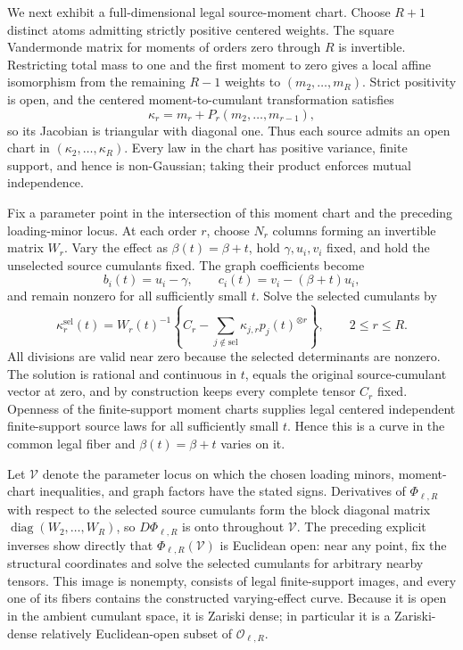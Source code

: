 We next exhibit a full-dimensional legal source-moment chart.  Choose \(R+1\) distinct atoms admitting strictly positive centered weights.  The square Vandermonde matrix for moments of orders zero through \(R\) is invertible.  Restricting total mass to one and the first moment to zero gives a local affine isomorphism from the remaining \(R-1\) weights to \((m_2,\ldots,m_R)\).  Strict positivity is open, and the centered moment-to-cumulant transformation satisfies
\[
 \kappa_r=m_r+P_r(m_2,\ldots,m_{r-1}),
\]
so its Jacobian is triangular with diagonal one.  Thus each source admits an open chart in \((\kappa_2,\ldots,\kappa_R)\).  Every law in the chart has positive variance, finite support, and hence is non-Gaussian; taking their product enforces mutual independence.

Fix a parameter point in the intersection of this moment chart and the preceding loading-minor locus.  At each order \(r\), choose \(N_r\) columns forming an invertible matrix \(W_r\).  Vary the effect as \(\beta(t)=\beta+t\), hold \(\gamma,u_i,v_i\) fixed, and hold the unselected source cumulants fixed.  The graph coefficients become
\[
 b_i(t)=u_i-\gamma,\qquad c_i(t)=v_i-(\beta+t)u_i,
\]
and remain nonzero for all sufficiently small \(t\).  Solve the selected cumulants by
\[
 \kappa^{\mathrm{sel}}_r(t)
 =W_r(t)^{-1}\left\{C_r-\sum_{j\notin\mathrm{sel}}
 \kappa_{j,r}p_j(t)^{\otimes r}\right\},
 \qquad 2\le r\le R.
\]
All divisions are valid near zero because the selected determinants are nonzero.  The solution is rational and continuous in \(t\), equals the original source-cumulant vector at zero, and by construction keeps every complete tensor \(C_r\) fixed.  Openness of the finite-support moment charts supplies legal centered independent finite-support source laws for all sufficiently small \(t\).  Hence this is a curve in the common legal fiber and \(\beta(t)=\beta+t\) varies on it.

Let \(\mathcal V\) denote the parameter locus on which the chosen loading minors, moment-chart inequalities, and graph factors have the stated signs.  Derivatives of \(\Phi_{\ell,R}\) with respect to the selected source cumulants form the block diagonal matrix \(\operatorname{diag}(W_2,\ldots,W_R)\), so \(D\Phi_{\ell,R}\) is onto throughout \(\mathcal V\).  The preceding explicit inverses show directly that \(\Phi_{\ell,R}(\mathcal V)\) is Euclidean open: near any point, fix the structural coordinates and solve the selected cumulants for arbitrary nearby tensors.  This image is nonempty, consists of legal finite-support images, and every one of its fibers contains the constructed varying-effect curve.  Because it is open in the ambient cumulant space, it is Zariski dense; in particular it is a Zariski-dense relatively Euclidean-open subset of \(\mathcal O_{\ell,R}\).

